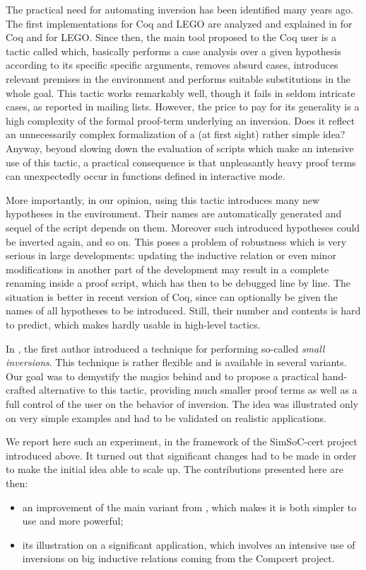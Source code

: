 \medskip
The practical need for automating inversion has been identified
many years ago.
The first implementations for Coq and LEGO
are analyzed and explained in
\cite{cornes95automating} for Coq
and \cite{McBride96} for LEGO.
Since then, the main tool proposed to the Coq user is
a tactic called \inversion which,
basically performs a case analysis over a given hypothesis
according to its specific specific arguments,
removes absurd cases,
introduces relevant premises in the environment
and performs suitable substitutions in the whole goal.
%
This tactic works remarkably well,
though it fails in seldom intricate cases,
as reported in mailing lists. 
%
However, the price to pay for its generality
is a high complexity of the formal proof-term underlying
an inversion. 
Does it reflect an unnecessarily complex formalization of a 
(at first sight) rather simple idea?
Anyway, 
beyond slowing down the evaluation of scripts which make
an intensive use of this tactic, 
a practical consequence is that
unpleasantly heavy proof terms can unexpectedly occur in
functions defined in interactive mode.

More importantly, in our opinion, using this tactic
introduces many new hypotheses in the environment.
Their names are automatically generated
and sequel of the script depends on them.
Moreover such introduced hypotheses could be inverted again,
and so on.
This poses a problem of robustness which is very serious
in large developments:
updating the inductive relation or
even minor modifications in another part of the development
may result in a complete renaming 
inside a proof script,
which has then to be debugged line by line.
The situation is better in recent version of Coq, 
since \inversion can optionally be given the names of all hypotheses
to be introduced.
Still, their number and contents is hard to predict,
which makes \inversion hardly usable in high-level tactics.

In \cite{small_inv}, 
the first author introduced a technique 
for performing
so-called \emph{small inversions}. 
This technique is rather flexible and is available in several variants.
Our goal was to demystify the magics behind \inversion
and to propose a practical hand-crafted alternative
to this tactic, 
providing much smaller proof terms as well as
a full control of the user on the behavior of inversion.
The idea was illustrated only on very simple examples
and had to be validated on realistic applications. 

We report here such an experiment, 
in the framework of the SimSoC-cert project introduced above.
It turned out that significant changes had to
be made in order to make the initial idea able
to scale up.
%
The contributions presented here are then:
\begin{itemize}
\item an improvement of the main variant from \cite{small_inv},
  which makes 
  it is both simpler to use and more powerful;
\item its illustration on a significant application,
  which involves an intensive use of inversions on 
  big inductive relations coming from the Compcert project.
\end{itemize}

